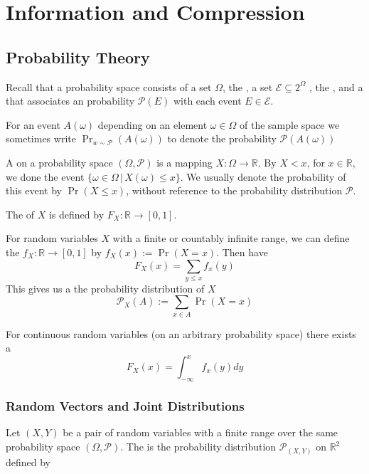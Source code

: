 \chapter{Information and Compression}
\section{Probability Theory}
Recall that a probability space consists of a set $\Omega$\mathmarginbox{$\Omega$}, the , a set $\mathcal{E} \subseteq 2^{\Omega}$ , the , and a  that associates an probability $\mathcal{P}(E)$ with each event $E \in \mathcal{E}$.

For an event $A(\omega)$ depending on an element $\omega \in \Omega$ of the sample space we sometimes write $\operatorname{Pr}_{w\sim\mathcal{P}}(A(\omega))$ to denote the probability $\mathcal{P}(A(\omega))$

A  on a probability space $(\Omega,\mathcal{P})$ is a mapping $X: \Omega \rightarrow \mathbb{R}$. By $X < x$, for  $x \in \mathbb{R}$, we done the event $\{\omega \in \Omega \,|\, X(\omega) \leq x\}$. We usually denote the probability of this event by $\operatorname{Pr}(X \leq x)$, without reference to the probability distribution $\mathcal{P}$.

The  of $X$ is defined by $F_X:\mathbb{R} \rightarrow [0,1]$.

For random variables $X$ with a finite or countably infinite range, we can define the  $f_X:\mathbb{R} \rightarrow [0,1]$ by $f_X(x) := \operatorname{Pr}(X=x)$. Then have
\begin{equation*}
F_X(x)=\sum_{y\leq x}f_x(y)
\end{equation*}
This gives us a  the probability distribution of $X$
\begin{equation*}
\mathcal{P}_X(A) := \sum_{x \in A} \operatorname{Pr}(X = x)
\end{equation*}

For continuous random variables (on an arbitrary probability space) there exists a 
\begin{equation*}
F_X(x) = \int_{-\infty}^{x}f_x(y)dy
\end{equation*}

\subsection{Random Vectors and Joint Distributions}
Let $(X,Y)$ be a pair of random variables with a finite range over the same probability space $(\Omega,\mathcal{P})$. The  is the probability distribution $\mathcal{P}_{(X,Y)}$ on $\mathbb{R}^2$ defined by

